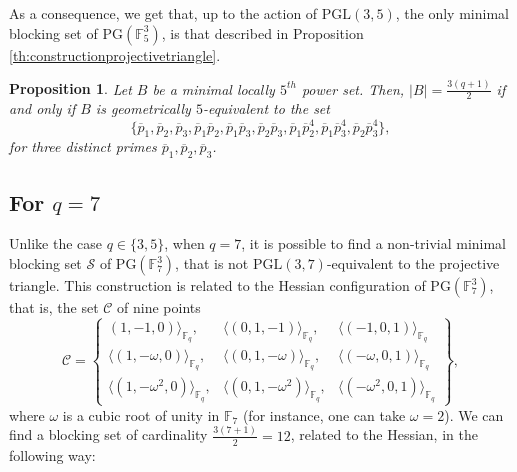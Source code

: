 \documentclass[12pt]{amsart}
\newtheorem{proposition}[theorem]{Proposition}
\newcommand{\F}{{\mathbb F}}
\newcommand{\fq}{{\mathbb F}_{q}}
\newcommand{\PG}{\mathrm{PG}}
\begin{document}
As a consequence, we get that, up to the action of $\mathrm{PGL}(3,5)$, the only minimal blocking set of $\PG(\F_{5}^{3})$, is that described in Proposition \ref{th:constructionprojectivetriangle}.

\begin{proposition} \label{th:classq5}
Let $B$ be a minimal locally $5^{th}$ power set. Then, 
            $\lvert B \rvert=\frac{3(q+1)}{2}$ if and only if $B$ is geometrically $5$-equivalent to the set \[\{\overline{p}_1,\overline{p}_2,\overline{p}_3,\overline{p}_1\overline{p}_2,\overline{p}_1\overline{p}_3,\overline{p}_2\overline{p}_3,\overline{p}_1\overline{p}_2^{4},\overline{p}_1\overline{p}_3^{4},\overline{p}_2\overline{p}_3^{4}\},\]
    for three distinct primes $\overline{p}_1,\overline{p}_2,\overline{p}_3$.
\end{proposition}

\subsection{For $q=7$}
Unlike the case $q \in \{3,5\}$, when $q=7$, it is possible to find a non-trivial minimal blocking set $\mathcal{S}$ of $\PG(\F_{7}^{3})$, that is not $\mathrm{PGL}(3,7)$-equivalent to the projective triangle. This construction is related to the Hessian configuration of $\PG(\F_{7}^{3})$, that is, the set $\mathcal{C}$ of nine points
\[
\mathcal{C}= \left\{ \begin{array}{ccc}
     (1,-1, 0) \rangle_{\fq}, & \langle (0,1,-1)\rangle_{\fq}, &\langle (-1, 0, 1) \rangle_{\fq}  \\
\langle (1,-\omega, 0) \rangle_{\fq}, & \langle(0,1,-\omega) \rangle_{\fq}, & \langle (-\omega, 0, 1) \rangle_{\fq} \\
\langle (1,-\omega^2, 0) \rangle_{\fq}, &\langle(0,1,-\omega^2) \rangle_{\fq}, &\langle (-\omega^2, 0, 1) \rangle_{\fq} 
\end{array}\right\},
\]
where $\omega$ is a cubic root of unity in $\F_{7}$ (for instance, one can take $\omega=2$). We can find a blocking set of cardinality $\frac{3(7+1)}{2} = 12$, related to the Hessian, in the following way:
\end{document}
